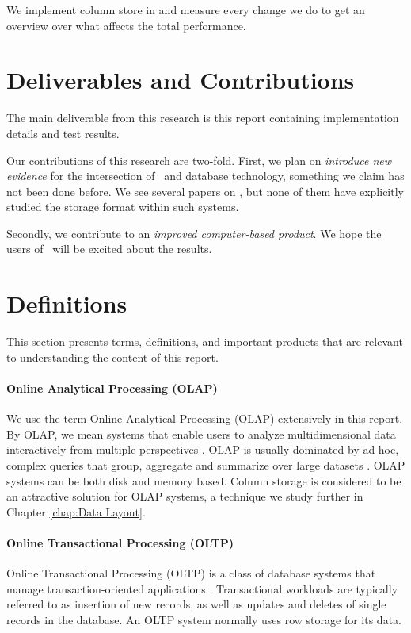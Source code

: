 We implement column store in \genusSoftware and measure every change we do to get an overview over what affects the total performance.


\section{Deliverables and Contributions}
\label{sec:Deliverables and Contributions}
The main deliverable from this research is this report containing implementation details and test results.

Our contributions of this research are two-fold. First, we plan on \textit{introduce new evidence} for the intersection of \mdd~and database technology, something we claim has not been done before. We see several papers on \mdd, but none of them have explicitly studied the storage format within such systems.

Secondly, we contribute to an \textit{improved computer-based product}. We hope the users of \genusSoftware~will be excited about the results.


\section{Definitions}
\label{sec:Definitions}
This section presents terms, definitions, and important products that are relevant to understanding the content of this report.

\paragraph{Online Analytical Processing (OLAP)}
\label{par:Online Analytical Processing (OLAP)}
  We use the term Online Analytical Processing (OLAP) extensively in this report. By OLAP, we mean systems that enable users to analyze multidimensional data interactively from multiple perspectives \cite{Wikipedia_contributors2015-hw}. OLAP is usually dominated by ad-hoc, complex queries that group, aggregate and summarize over large datasets \cite{Bjorklund2011-wh}. OLAP systems can be both disk and memory based. Column storage is considered to be an attractive solution for OLAP systems, a technique we study further in Chapter \ref{chap:Data Layout}.


\paragraph{Online Transactional Processing (OLTP)}
\label{par:Online Transactional Processing (OLTP)}
Online Transactional Processing (OLTP) is a class of database systems that manage transaction-oriented applications \cite{Wikipedia_contributors2015-cw}. Transactional workloads are typically referred to as insertion of new records, as well as updates and deletes of single records in the database. An OLTP system normally uses row storage for its data.

